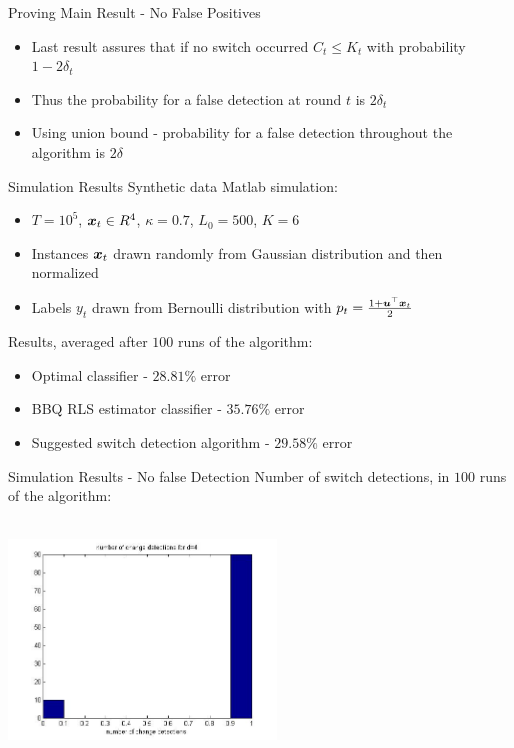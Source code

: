 \documentclass{beamer}
\begin{document}
\begin{frame}{Proving Main Result - No False Positives}
\begin{itemize}
\item Last result assures that if no switch occurred $C_t\leq K_t$ with probability $1-2\delta_t$\newline
\item Thus  the probability for a false detection at round $t$ is $2\delta_t$\newline
\item Using union bound - probability for a false detection throughout the algorithm is $2\delta$\newline


\end{itemize}
\end{frame}

\begin{frame}{Simulation Results}
Synthetic data Matlab simulation:\newline
\begin{itemize}
\item $T=10^5$, ${\boldsymbol{x}}_{t}\in R^4$, $\kappa=0.7$, $L_0=500$, $K=6$
\item Instances ${\boldsymbol{x}}_{t}$ drawn randomly from Gaussian distribution and then normalized
\item Labels $y_t$ drawn from Bernoulli distribution with $p_t=\frac{1+{{\boldsymbol{u}}}^{\top}{\boldsymbol{x}}_{t}}{2}$\newline
\end{itemize}
Results, averaged after $100$ runs of the algorithm:\newline
\begin{itemize}
\item Optimal classifier - $28.81\%$ error
\item BBQ RLS estimator classifier - $35.76\%$ error
\item Suggested switch detection algorithm - $29.58\%$ error
\end{itemize}
\end{frame}

\begin{frame}{Simulation Results - No false Detection}
Number of switch detections, in $100$ runs of the algorithm:
\begin{center}
\includegraphics[height=2.5in,width=2.8in]{Ndet_clas.jpg}
\end{center}
\end{frame}
\end{document}

